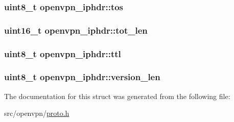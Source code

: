 \subsubsection[{tos}]{\setlength{\rightskip}{0pt plus 5cm}uint8\+\_\+t openvpn\+\_\+iphdr\+::tos}\label{structopenvpn__iphdr_a7d9f9091a70b79f109b955d1847f0cdd}
\hypertarget{structopenvpn__iphdr_a85f8dfbea42552b0b223ea33e631e00f}{}
\subsubsection[{tot\+\_\+len}]{\setlength{\rightskip}{0pt plus 5cm}uint16\+\_\+t openvpn\+\_\+iphdr\+::tot\+\_\+len}\label{structopenvpn__iphdr_a85f8dfbea42552b0b223ea33e631e00f}
\hypertarget{structopenvpn__iphdr_ac44b0a0f71994e78650cd99ef5fff6f4}{}
\subsubsection[{ttl}]{\setlength{\rightskip}{0pt plus 5cm}uint8\+\_\+t openvpn\+\_\+iphdr\+::ttl}\label{structopenvpn__iphdr_ac44b0a0f71994e78650cd99ef5fff6f4}
\hypertarget{structopenvpn__iphdr_af3c74339e4e6ab5c8edbb5b8d1ab3fa6}{}
\subsubsection[{version\+\_\+len}]{\setlength{\rightskip}{0pt plus 5cm}uint8\+\_\+t openvpn\+\_\+iphdr\+::version\+\_\+len}\label{structopenvpn__iphdr_af3c74339e4e6ab5c8edbb5b8d1ab3fa6}


The documentation for this struct was generated from the following file\+:\begin{DoxyCompactItemize}
\item 
src/openvpn/\hyperlink{proto_8h}{proto.\+h}\end{DoxyCompactItemize}
